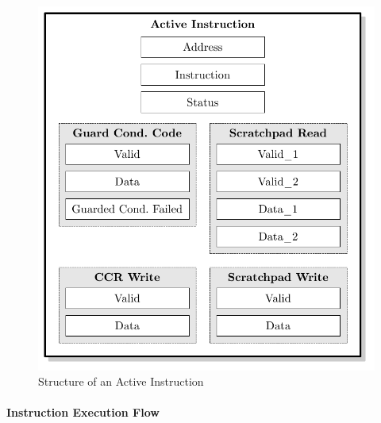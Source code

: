 \begin{figure}[htb]
 \centering
 \includegraphics[scale=1.0]{images/active_inst}
 \caption{Structure of an Active Instruction}
\label{fig:active_inst}
\end{figure}

\paragraph{Instruction Execution Flow}

